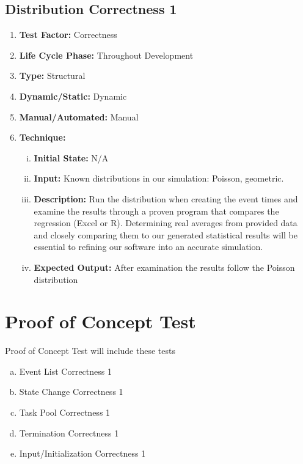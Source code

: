 \documentclass[paper=letter, fontsize=10pt]{scrartcl}
\numberwithin{equation}{section}		%
\numberwithin{figure}{section}			%
\numberwithin{table}{section}				%
\begin{document}
\subsection{Distribution Correctness 1}
\begin{enumerate}[]
	\item \textbf{Test Factor:} Correctness 
	\item \textbf{Life Cycle Phase:} Throughout Development
	\item \textbf{Type:} Structural
	\item \textbf{Dynamic/Static:} Dynamic
	\item \textbf{Manual/Automated:} Manual
	\item \textbf{Technique:}
		\begin{enumerate}[(i)]
			\item \textbf{Initial State:} N/A  
			\item \textbf{Input:} Known distributions in our simulation: Poisson, geometric.
			\item \textbf{Description:} Run the distribution when creating the event times and examine the results through a proven program that compares the regression (Excel or R). Determining real averages from provided data and closely comparing them to our generated statistical results will be essential to refining our software into an accurate simulation.
			\item \textbf{Expected Output:} After examination the results follow the Poisson distribution
		\end{enumerate}
\end{enumerate}

\section{Proof of Concept Test}
Proof of Concept Test will include these tests
\begin{enumerate}[(a)]
	\item Event List Correctness 1
	\item State Change Correctness 1
	\item Task Pool Correctness 1
	\item Termination Correctness 1
	\item Input/Initialization Correctness 1
\end{enumerate}
\end{document}
